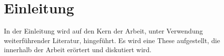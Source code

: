 \section{Einleitung}
In der Einleitung wird auf den Kern der Arbeit, unter Verwendung weiterführender Literatur, hingeführt. Es wird eine These aufgestellt, die innerhalb der Arbeit erörtert und diskutiert wird.\\